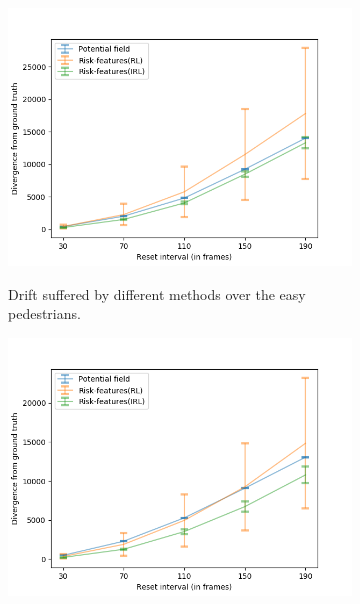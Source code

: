 %
\begin{figure}[htbp]
	\begin{subfigure}{0.5\textwidth}
		\centering
		\includegraphics[width=\linewidth]{plots/ucy_inter_method_new/drift_easy_ucy_inter_method.png}
		\label{subfig:inter_method-drift_analysis_easy}
		\caption{Drift suffered by different methods over the easy pedestrians.}
	\end{subfigure}
	\begin{subfigure}{0.5\textwidth}
		\centering
		\includegraphics[width=\linewidth]{plots/ucy_inter_method_new/drift_med_ucy_inter_method.png}

\end{subfigure}
\end{figure}

